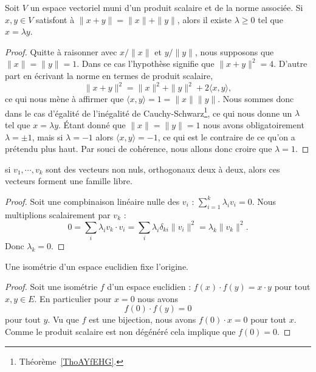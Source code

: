 \begin{lemma}   \label{LemLPOHUme}
    Soit \( V\) un espace vectoriel muni d'un produit scalaire et de la norme associée. Si \( x,y\in V\) satisfont à \( \| x+y \|=\| x \|+\| y \|\), alors il existe \( \lambda\geq 0\) tel que \( x=\lambda y\).
\end{lemma}

\begin{proof}
    Quitte à raisonner avec \( x/\| x \|\) et \( y/\| y \|\), nous supposons que \( \| x \|=\| y \|=1\). Dans ce cas l'hypothèse signifie que \( \| x+y \|^2=4\). D'autre part en écrivant la norme en termes de produit scalaire,
    \begin{equation}
        \| x+y \|^2=\| x \|^2+\| y \|^2+2\langle x, y\rangle ,
    \end{equation}
    ce qui nous mène à affirmer que \( \langle x, y\rangle =1=\| x \|\| y \|\). Nous sommes donc dans le cas d'égalité de l'inégalité de Cauchy-Schwarz\footnote{Théorème~\ref{ThoAYfEHG}.}, ce qui nous donne un \( \lambda\) tel que \( x=\lambda y\). Étant donné que \( \| x \|=\| y \|=1\) nous avons obligatoirement \( \lambda=\pm 1\), mais si \( \lambda=-1\) alors \( \langle x, y\rangle =-1\), ce qui est le contraire de ce qu'on a prétendu plus haut. Par souci de cohérence, nous allons donc croire que \( \lambda=1\).
\end{proof}

\begin{proposition}			\label{PropVectsOrthLibres}
	si $v_1,\cdots,v_k$ sont des vecteurs non nuls, orthogonaux deux à deux, alors ces vecteurs forment une famille libre.
\end{proposition}

\begin{proof}
    Soit une compbinaison linéaire nulle des \( v_i\) : \( \sum_{i=1}^k\lambda_iv_i=0\). Nous multiplions scalairement par \( v_k\) :
    \begin{equation}
        0=\sum_i\lambda_iv_k\cdot v_i=\sum_i\lambda_i\delta_{ki}\| v_i \|^2=\lambda_k\| v_k \|^2.
    \end{equation}
    Donc \( \lambda_k=0\).
\end{proof}

\begin{lemma}       \label{LEMooYXJZooWKRFRu}
    Une isométrie d'un espace euclidien fixe l'origine.
\end{lemma}

\begin{proof}
    Soit une isométrie \( f\) d'un espace euclidien : \( f(x)\cdot f(y)=x\cdot y\) pour tout \( x,y\in E\). En particulier pour \( x=0\) nous avons
    \begin{equation}
        f(0)\cdot f(y)=0
    \end{equation}
    pour tout \( y\). Vu que \( f\) est une bijection, nous avons \( f(0)\cdot x=0\) pour tout \( x\). Comme le produit scalaire est non dégénéré cela implique que \( f(0)=0\).
\end{proof}

